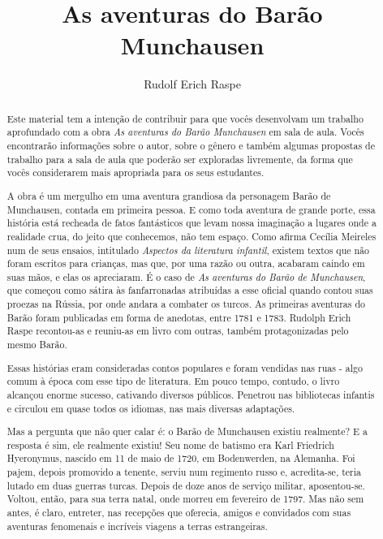 \documentclass[11pt]{extarticle}
\newcommand{\AutorLivro}{Rudolf Erich Raspe}
\newcommand{\TituloLivro}{As aventuras do Barão Munchausen}
\newcommand{\colaborador}{Gabriela Karam}
\begin{document}
\title{\TituloLivro}
\author{\AutorLivro}
\def\authornotes{\colaborador}

\date{}
\maketitle


\tableofcontents


\begin{abstract}
Este material tem a intenção de contribuir para que vocês desenvolvam um trabalho aprofundado com a obra \textit{As aventuras do Barão Munchausen} em sala de aula.
Vocês encontrarão informações sobre o autor, sobre o gênero e também 
algumas propostas de trabalho para a sala de aula que poderão ser exploradas livremente, 
da forma que vocês considerarem mais apropriada para os seus estudantes.

A obra é um mergulho em uma aventura grandiosa da personagem Barão de Munchausen, contada em primeira pessoa. E como toda aventura de grande porte, essa história está recheada de fatos fantásticos que levam nossa imaginação a lugares onde a realidade crua, do jeito que conhecemos, não tem espaço. Como afirma Cecília Meireles num de seus ensaios, intitulado \textit{Aspectos da literatura infantil}, existem textos que não foram escritos para crianças, mas que, por uma razão ou outra, acabaram caindo em suas mãos, e elas os apreciaram. É o caso de \textit{As aventuras do Barão de Munchausen}, que começou como sátira às fanfarronadas atribuídas a esse oficial quando contou suas proezas na Rússia, por onde andara a combater os turcos. As primeiras aventuras do Barão foram publicadas em forma de anedotas, entre 1781 e 1783. Rudolph Erich Raspe recontou-as e reuniu-as em livro com outras, também protagonizadas pelo mesmo Barão. 

Essas histórias eram consideradas contos populares e foram vendidas nas ruas - algo comum à época com esse tipo de literatura. Em pouco tempo, contudo, o livro alcançou enorme sucesso, cativando diversos públicos. Penetrou nas bibliotecas infantis e circulou em quase todos os idiomas, nas mais diversas adaptações. 

Mas a pergunta que não quer calar é: o Barão de Munchausen existiu realmente? E a resposta é sim, ele realmente existiu! Seu nome de batismo era Karl Friedrich Hyeronymus, nascido em 11 de maio de 1720, em Bodenwerden, na Alemanha. Foi pajem, depois promovido a tenente, serviu num regimento russo e, acredita-se, teria lutado em duas guerras turcas. Depois de doze anos de serviço militar, aposentou-se. Voltou, então, para sua terra natal, onde morreu em fevereiro de 1797. Mas não sem antes, é claro, entreter, nas recepções que oferecia, amigos e convidados com suas aventuras fenomenais e incríveis viagens a terras estrangeiras. 


\end{abstract}
\end{document}
